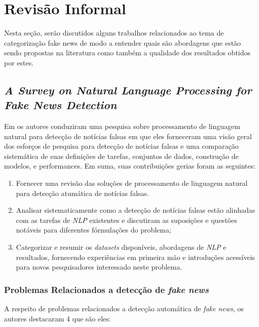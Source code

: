 \section{Revisão Informal}

Nesta seção, serão discutidos alguns trabalhos relacionados ao tema de
categorização fake news de modo a entender quais são abordagens que estão sendo
propostas na literatura como também a qualidade dos resultados obtidos por estes.

\subsection{\textit{A Survey on Natural Language Processing for Fake News Detection}}

Em \cite{oshikawa2020} os autores conduziram uma pesquisa sobre processamento de linguagem natural para detecção de notícias falsas em que eles forneceram uma visão geral dos esforços de pesquisa para detecção de notícias falsas e uma comparação sistemática de suas definições de tarefas, conjuntos de dados, construção de modelos, e performances. Em suma, suas contribuições gerias foram as seguintes: \\

\begin{enumerate}
    \item Fornecer uma revisão das soluções de processamento de linguagem natural para detecção atumática de notícias falsas.
    
    \item Analisar sistematicamente como a detecção de notícias falsas estão alinhadas com as tarefas de \textit{NLP} existentes e discutiram as suposições e questões notáveis para diferentes fórmulações do problema;
    
    \item Categorizar e resumir os \textit{datasets} disponíveis, abordagens de \textit{NLP} e resultados, fornecendo experiências em primeira mão e introduções acessíveis para novos pesquisadores interessado neste problema.
\end{enumerate}

\subsubsection{Problemas Relacionados a detecção de \textit{fake news}}

A respeito de problemas relacionados a detecção automática de \textit{fake news}, os autores destacaram 4 que são eles: \\

